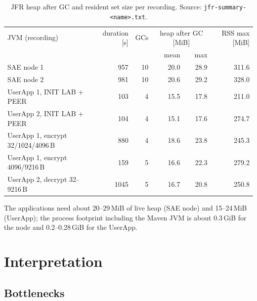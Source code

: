 \documentclass[11pt,a4paper]{report}
\begin{document}
\begin{table}[htbp]
\centering\small
\begin{tabular}{lrrrrr}
\toprule
JVM (recording) & duration [s] & GCs & \multicolumn{2}{c}{heap after GC [MiB]} & RSS max [MiB] \\
 & & & mean & max & \\
\midrule
SAE node 1 & 957 & 10 & 20.0 & 28.9 & 311.6 \\
SAE node 2 & 981 & 10 & 20.6 & 29.2 & 328.0 \\
UserApp 1, INIT LAB + PEER & 103 & 4 & 15.5 & 17.8 & 211.0 \\
UserApp 2, INIT LAB + PEER & 104 & 4 & 15.1 & 17.6 & 274.7 \\
UserApp 1, encrypt 32/1024/4096\,B & 880 & 4 & 18.6 & 23.8 & 245.3 \\
UserApp 1, encrypt 4096/9216\,B & 159 & 5 & 16.6 & 22.3 & 279.2 \\
UserApp 2, decrypt 32--9216\,B & 1045 & 5 & 16.7 & 20.8 & 250.8 \\
\bottomrule
\end{tabular}
\caption{JFR heap after GC and resident set size per recording. Source: \texttt{jfr-summary-<name>.txt}.}
\label{tab:res-jfr}
\end{table}

The applications need about 20--29\,MiB of live heap (SAE node) and 15--24\,MiB (UserApp); the process footprint including the Maven JVM is about 0.3\,GiB for the node and 0.2--0.28\,GiB for the UserApp.

\chapter{Interpretation}

\section{Bottlenecks}
\end{document}
